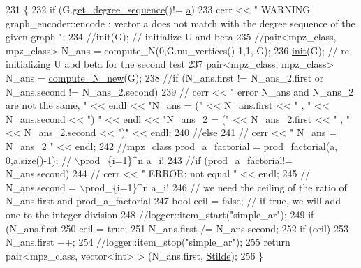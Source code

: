 \begin{DoxyCode}
231                                                                  \{
232   \textcolor{keywordflow}{if} (G.\hyperlink{classgraph_afdca627df7fb93a7d1d8a547f616e948}{get\_degree\_sequence}()!= \hyperlink{classgraph__encoder_a56eb5cf480ae5c2fca9f3a45f2ffd4f1}{a})
233     cerr << \textcolor{stringliteral}{" WARNING graph\_encoder::encode : vector a does not match with the degree sequence of the given
       graph "};
234   \textcolor{comment}{//init(G); // initialize U and beta }
235   \textcolor{comment}{//pair<mpz\_class, mpz\_class> N\_ans  = compute\_N(0,G.nu\_vertices()-1,1, G);}
236   \hyperlink{classgraph__encoder_a6cfb6fca4bc50d4e5d267060a91f43c3}{init}(G); \textcolor{comment}{// re initializing U abd beta for the second test}
237   pair<mpz\_class, mpz\_class> N\_ans = \hyperlink{classgraph__encoder_aeab221523400ec73da6146fdbbd11274}{compute\_N\_new}(G);
238   \textcolor{comment}{//if (N\_ans.first != N\_ans\_2.first or N\_ans.second != N\_ans\_2.second)}
239   \textcolor{comment}{//  cerr << " error N\_ans and N\_ans\_2 are not the same, "  << endl << "N\_ans = (" << N\_ans.first << " , "
       << N\_ans.second << ") " << endl << "N\_ans\_2 = (" << N\_ans\_2.first << " , " << N\_ans\_2.second << ")" <<
       endl;}
240   \textcolor{comment}{//else}
241   \textcolor{comment}{//  cerr << " N\_ans = N\_ans\_2 " << endl;}
242   \textcolor{comment}{//mpz\_class prod\_a\_factorial = prod\_factorial(a, 0,a.size()-1); // \(\backslash\)prod\_\{i=1\}^n a\_i!}
243   \textcolor{comment}{//if (prod\_a\_factorial!= N\_ans.second)}
244   \textcolor{comment}{//  cerr << " ERROR: not equal " << endl;}
245   \textcolor{comment}{// N\_ans.second = \(\backslash\)prod\_\{i=1\}^n a\_i!}
246   \textcolor{comment}{// we need the ceiling of the ratio of N\_ans.first and prod\_a\_factorial}
247   \textcolor{keywordtype}{bool} ceil = \textcolor{keyword}{false}; \textcolor{comment}{// if true, we will add one to the integer division}
248   \textcolor{comment}{//logger::item\_start("simple\_ar");}
249   \textcolor{keywordflow}{if} (N\_ans.first %
250     ceil = \textcolor{keyword}{true};
251   N\_ans.first /= N\_ans.second;
252   \textcolor{keywordflow}{if} (ceil)
253     N\_ans.first ++;
254   \textcolor{comment}{//logger::item\_stop("simple\_ar");}
255   \textcolor{keywordflow}{return} pair<mpz\_class, vector<int> > (N\_ans.first, \hyperlink{classgraph__encoder_a342688a3fdee511b7fae3f155cfb10cf}{Stilde});
256 \}
\end{DoxyCode}
\mbox{\label{classgraph__encoder_a6cfb6fca4bc50d4e5d267060a91f43c3}} 
